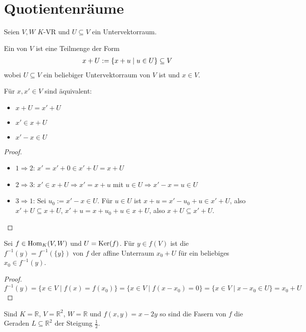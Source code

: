 \section{Quotientenräume}

Seien $V,W$ $K$-VR und $U\subseteq V$ ein Untervektorraum.

\begin{definition}
	Ein  von $V$ ist eine Teilmenge der Form 
	\begin{align}
		x+U:=\{x+u\mid u \in U\}\subseteq V\notag
	\end{align}
	wobei $U\subseteq V$ ein beliebiger Untervektorraum von $V$ ist und $x\in V$.
\end{definition}

\begin{lemma}
	Für $x,x'\in V$ sind äquivalent:
	\begin{itemize}
		\item $x+U=x'+U$
		\item $x'\in x+U$
		\item $x'-x\in U$
	\end{itemize}
\end{lemma}
\begin{proof}
	\begin{itemize}
		\item $1\Rightarrow 2$: $x'=x'+0\in x'+U=x+U$
		\item $2\Rightarrow 3$: $x'\in x+U \Rightarrow x'=x+u$ mit $u\in U\Rightarrow x'-x=u\in U$
		\item $3\Rightarrow 1$: Sei $u_0:=x'-x\in U$. Für $u\in U$ ist
		$x+u=x'-u_0+u\in x'+U$, also $x'+U\subseteq x+U$,
		$x'+u=x+u_0+u\in x+U$, also $x+U\subseteq x'+U$.
	\end{itemize}
\end{proof}

\begin{lemma}
	Sei $f\in \operatorname{Hom}_K(V,W)$ und $U=\operatorname{Ker}(f)$. Für $y\in f(V)$ ist die  $f^{-1}(y)=f^{-1}(\{y\})$ von $f$ der affine 
	Unterraum $x_0+U$ für ein beliebiges $x_0\in f^{-1}(y)$.
\end{lemma}
\begin{proof}
	$f^{-1}(y)=\{x\in V \mid f(x)=f(x_0)\}=\{x\in V \mid f(x-x_0)=0\} = \{x\in V \mid x-x_0\in U\}=x_0+U$
\end{proof}

\begin{example}
	Sind $K=\mathbb R$, $V=\mathbb R^2$, $W=\mathbb R$ und $f(x,y)=x-2y$ so sind die Fasern von $f$ die Geraden $L\subseteq 
	\mathbb R^2$ der Steigung $\frac 1 2$.
\end{example}

